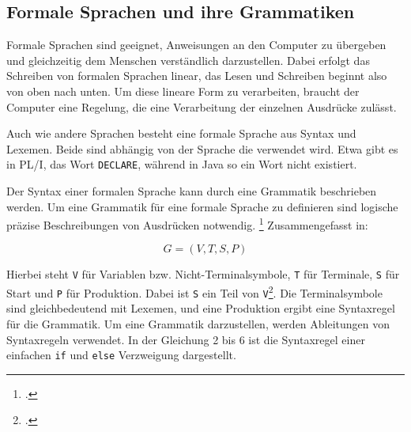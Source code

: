 \pagebreak
   
   
\subsection{Formale Sprachen und ihre Grammatiken}
Formale Sprachen sind geeignet, Anweisungen an den Computer zu übergeben und gleichzeitig dem Menschen verständlich darzustellen. Dabei erfolgt das Schreiben von formalen Sprachen linear, das Lesen und Schreiben beginnt also von oben nach unten. Um diese lineare Form zu verarbeiten, braucht der Computer eine Regelung, die eine Verarbeitung der einzelnen Ausdrücke zulässt.

Auch wie andere Sprachen besteht eine formale Sprache aus Syntax und Lexemen.
Beide sind abhängig von der Sprache die verwendet wird.
Etwa gibt es in PL/I, das Wort \verb+DECLARE+, während in Java so ein Wort
nicht existiert.

Der Syntax einer formalen Sprache kann durch eine Grammatik beschrieben werden.
Um eine Grammatik für eine formale Sprache zu definieren sind logische präzise Beschreibungen von Ausdrücken notwendig. \footcite[Vgl. ][S. 149ff. ]{automata} Zusammengefasst in:

\begin{center}
	\begin{equation}\label{eqn:grammar}
		G=(V,T,S,P)
	\end{equation}
\end{center}


Hierbei steht \verb+V+ für Variablen bzw. Nicht-Terminalsymbole, \verb+T+ für Terminale, \verb+S+ für Start und \verb+P+ für Produktion. Dabei ist \verb+S+ ein Teil von \verb+V+\footcite[Vgl.][S. 31ff.]{automata}. Die Terminalsymbole sind gleichbedeutend mit Lexemen, und eine Produktion ergibt eine Syntaxregel für die Grammatik. Um eine Grammatik darzustellen, werden Ableitungen von Syntaxregeln verwendet. In der Gleichung 2 bis 6 ist die Syntaxregel einer einfachen \verb+if+ und \verb+else+ Verzweigung dargestellt.

